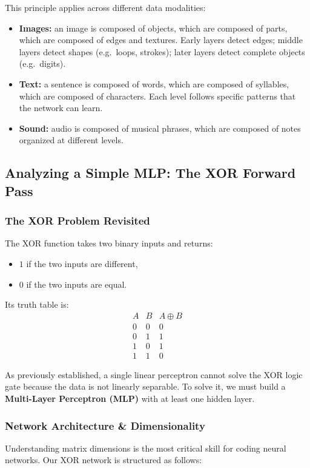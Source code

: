 \documentclass[11pt]{article}
\theoremstyle{smallexample}
\begin{document}
This principle applies across different data modalities:

\begin{itemize}
    \item \textbf{Images:} an image is composed of objects, which are composed of parts, which are
          composed of edges and textures. Early layers detect edges; middle layers detect shapes
          (e.g.\ loops, strokes); later layers detect complete objects (e.g.\ digits).
    \item \textbf{Text:} a sentence is composed of words, which are composed of syllables, which are
          composed of characters. Each level follows specific patterns that the network can learn.
    \item \textbf{Sound:} audio is composed of musical phrases, which are composed of notes organized
          at different levels.
\end{itemize}

\subsection{Analyzing a Simple MLP: The XOR Forward Pass}

\subsubsection{The XOR Problem Revisited}

The XOR function takes two binary inputs and returns:
\begin{itemize}
    \item \(1\) if the two inputs are different,
    \item \(0\) if the two inputs are equal.
\end{itemize}

Its truth table is:
\[
\begin{array}{c|c|c}
A & B & A \oplus B \\
\hline
0 & 0 & 0 \\
0 & 1 & 1 \\
1 & 0 & 1 \\
1 & 1 & 0
\end{array}
\]


As previously established, a single linear perceptron cannot solve the XOR logic gate because the data is not linearly separable. To solve it, we must build a \textbf{Multi-Layer Perceptron (MLP)} with at least one hidden layer. 



\subsubsection{Network Architecture \& Dimensionality}
Understanding matrix dimensions is the most critical skill for coding neural networks. Our XOR network is structured as follows:
\end{document}

